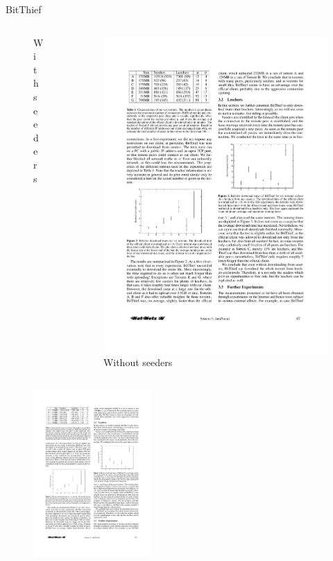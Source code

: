 \begin{frame}{BitThief}
\begin{columns}
\begin{column}{0.40\textwidth}
\begin{figure}
	\caption{With seeders}
\end{figure}
\end{column}
\begin{column}{0.40\textwidth}
\begin{figure}
	\includegraphics[width=\textwidth]{bitthief3}
	\caption{Without seeders}
\end{figure}
\end{column}
\end{columns}

\begin{figure}
	\includegraphics[width=0.4\textwidth]{bitthief4}
\end{figure}

\end{frame}

